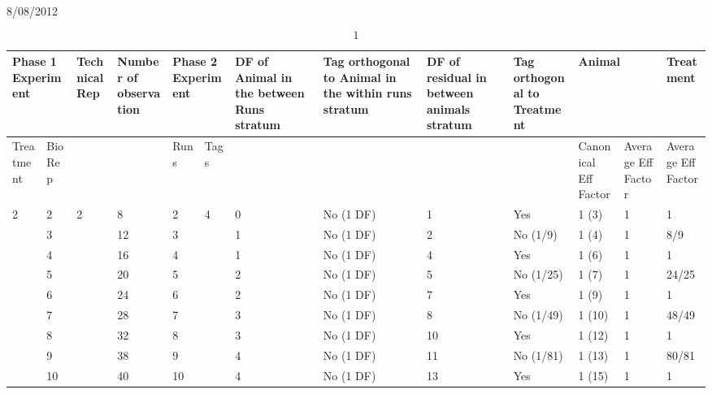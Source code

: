 
     8/08/2012

\noindent 
\[1\] 


\begin{tabular}{|p{0.5in}|p{0.4in}|p{0.5in}|p{0.7in}|p{0.3in}|p{0.3in}|p{0.7in}|p{0.7in}|p{0.6in}|p{0.6in}|p{0.5in}|p{0.5in}|p{0.6in}|} \hline 
\multicolumn{2}{|p{1in}|}{Phase 1 Experiment} & Technical Rep & Number of observation  & \multicolumn{2}{|p{0.7in}|}{Phase 2 Experiment} & DF of Animal in the between Runs stratum  & Tag orthogonal to Animal in the within runs stratum & DF of residual in between animals stratum & Tag orthogonal to Treatment & \multicolumn{2}{|p{1.0in}|}{Animal} & Treatment \\ \hline 
Treatment & Bio Rep &  &  & Runs & Tags  &  &  &  &  & Canonical Eff Factor & Average Eff Factor & Average Eff Factor \\ \hline 
2 & 2 & 2 & 8 & 2 & 4 & 0 & No (1 DF) & 1 & Yes & 1 (3) & 1 & 1 \\ \hline 
 & 3 &  & 12 & 3 &  & 1 & No (1 DF) & 2 & No (1/9) & 1 (4) & 1 & 8/9 \\ \hline 
 & 4 &  & 16 & 4 &  & 1 & No (1 DF) & 4 & Yes & 1 (6) & 1 & 1 \\ \hline 
 & 5 &  & 20 & 5 &  & 2 & No (1 DF) & 5 & No (1/25) & 1 (7) & 1 & 24/25 \\ \hline 
 & 6 &  & 24 & 6 &  & 2 & No (1 DF) & 7 & Yes & 1 (9) & 1 & 1 \\ \hline 
 & 7 &  & 28 & 7 &  & 3 & No (1 DF) & 8 & No (1/49) & 1 (10) & 1 & 48/49 \\ \hline 
 & 8 &  & 32 & 8 &  & 3 & No (1 DF) & 10 & Yes & 1 (12) & 1 & 1 \\ \hline 
 & 9 &  & 38 & 9 &  & 4 & No (1 DF) & 11 & No (1/81) & 1 (13) & 1 & 80/81 \\ \hline 
 & 10 &  & 40 & 10 &  & 4 & No (1 DF) & 13 & Yes & 1 (15) & 1 & 1 \\ \hline 
\end{tabular}



\noindent 


